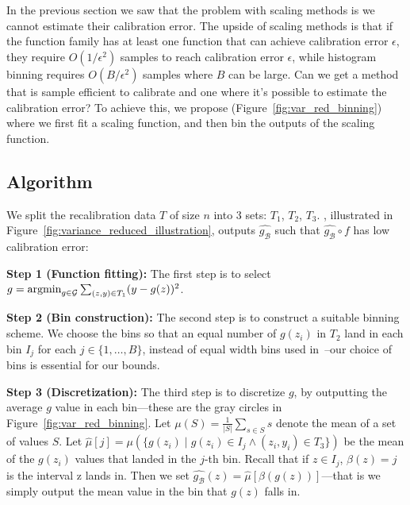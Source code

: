 \section{\Ourcal{}}
\label{sec:calibrating_models}

In the previous section we saw that the problem with scaling methods is we cannot estimate their calibration error. The upside of scaling methods is that if the function family has at least one function that can achieve calibration error $\epsilon$, they require $O(1/\epsilon^2)$ samples to reach calibration error $\epsilon$, while histogram binning requires $O(B/\epsilon^2)$ samples where $B$ can be large. Can we get a method that is sample efficient to calibrate and one where it's possible to estimate the calibration error?
To achieve this, we propose \ourcal{} (Figure~\ref{fig:var_red_binning}) where we first fit a scaling function, and then bin the outputs of the scaling function.

\subsection{Algorithm}

We split the recalibration data $T$ of size $n$ into 3 sets: $T_1$, $T_2$, $T_3$. \Ourcal{}, illustrated in Figure~\ref{fig:variance_reduced_illustration}, outputs $\hat{g_{\mathcal{B}}}$ such that $\hat{g_{\mathcal{B}}} \circ f$ has low calibration error:

\textbf{Step 1 (Function fitting):} The first step is to select $g = \mathop{\mbox{argmin}}_{g \in \mathcal{G}} \sum_{(z, y) \in T_1} (y - g(z))^2$.

\textbf{Step 2 (Bin construction):} The second step is to construct a suitable binning scheme. We choose the bins so that an equal number of $g(z_i)$ in $T_2$ land in each bin $I_j$ for each $j \in \{1, \dots, B\}$, instead of equal width bins used in~\cite{guo2017calibration}--our choice of bins is essential for our bounds.

\textbf{Step 3 (Discretization):} The third step is to discretize $g$, by outputting the average $g$ value in each bin---these are the gray circles in Figure~\ref{fig:var_red_binning}. Let $\mu(S) = \frac{1}{|S|} \sum_{s \in S} s$ denote the mean of a set of values $S$.
Let $\hat{\mu}[j] = \mu(\{ g(z_i) \; | \; g(z_i) \in I_j \wedge (z_i, y_i) \in T_3 \})$ be the mean of the $g(z_i)$ values that landed in the $j$-th bin.
Recall that if $z \in I_j$, $\beta(z) = j$ is the interval z lands in.
Then we set $\hat{g_{\mathcal{B}}}(z) = \hat{\mu}[\beta(g(z))]$---that is we simply output the mean value in the bin that $g(z)$ falls in.

